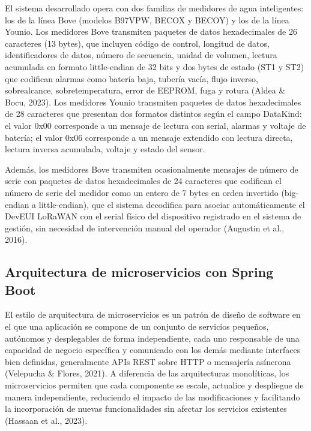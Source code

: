 \documentclass[12pt,a4paper,oneside]{report}
\begin{document}
El sistema desarrollado opera con dos familias de medidores de agua inteligentes: los de la línea Bove (modelos B97VPW, BECOX y BECOY) y los de la línea Younio. Los medidores Bove transmiten paquetes de datos hexadecimales de 26 caracteres (13 bytes), que incluyen código de control, longitud de datos, identificadores de datos, número de secuencia, unidad de volumen, lectura acumulada en formato little-endian de 32 bits y dos bytes de estado (ST1 y ST2) que codifican alarmas como batería baja, tubería vacía, flujo inverso, sobrealcance, sobretemperatura, error de EEPROM, fuga y rotura (Aldea \& Bocu, 2023). Los medidores Younio transmiten paquetes de datos hexadecimales de 28 caracteres que presentan dos formatos distintos según el campo DataKind: el valor 0x00 corresponde a un mensaje de lectura con serial, alarmas y voltaje de batería; el valor 0x06 corresponde a un mensaje extendido con lectura directa, lectura inversa acumulada, voltaje y estado del sensor.

Además, los medidores Bove transmiten ocasionalmente mensajes de número de serie con paquetes de datos hexadecimales de 24 caracteres que codifican el número de serie del medidor como un entero de 7 bytes en orden invertido (big-endian a little-endian), que el sistema decodifica para asociar automáticamente el DevEUI LoRaWAN con el serial físico del dispositivo registrado en el sistema de gestión, sin necesidad de intervención manual del operador (Augustin et al., 2016).

\subsection{Arquitectura de microservicios con Spring Boot}\label{arquitectura-de-microservicios-con-spring-boot}

El estilo de arquitectura de microservicios es un patrón de diseño de software en el que una aplicación se compone de un conjunto de servicios pequeños, autónomos y desplegables de forma independiente, cada uno responsable de una capacidad de negocio específica y comunicado con los demás mediante interfaces bien definidas, generalmente APIs REST sobre HTTP o mensajería asíncrona (Velepucha \& Flores, 2021). A diferencia de las arquitecturas monolíticas, los microservicios permiten que cada componente se escale, actualice y despliegue de manera independiente, reduciendo el impacto de las modificaciones y facilitando la incorporación de nuevas funcionalidades sin afectar los servicios existentes (Hassaan et al., 2023).
\end{document}
